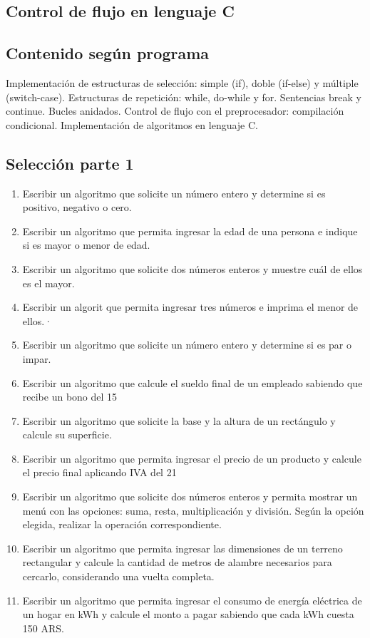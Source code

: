 \setcounter{subsection}{5}
\subsection*{Control de flujo en lenguaje C}
\subsection*{Contenido según programa}
Implementación de estructuras de selección: simple (if), doble (if-else) y múltiple (switch-case). Estructuras de repetición: while, do-while y for. Sentencias break y continue. Bucles anidados. Control de flujo con el preprocesador: compilación condicional. Implementación de algoritmos en lenguaje C.

\begin{ejercicioClase}
  \subsection*{Selección parte 1}
  \begin{enumerate}
    \item Escribir un algoritmo que solicite un número entero y determine si es positivo,  negativo o cero.
    \item Escribir un algoritmo que permita ingresar la edad de una persona e indique si es mayor o menor de edad.
    \item Escribir un algoritmo que solicite dos números enteros y muestre cuál de ellos es el mayor.
    \item Escribir un algorit que permita ingresar tres números e imprima el menor de ellos.·
    \item Escribir un algoritmo que solicite un número entero y determine si es par o impar.
    \item Escribir un algoritmo que calcule el sueldo final de un empleado sabiendo que recibe un bono del 15%
    \item Escribir un algoritmo que solicite la base y la altura de un rectángulo y calcule su superficie.
    \item Escribir un algoritmo que permita ingresar el precio de un producto y calcule el precio final aplicando IVA del 21%
    \item Escribir un algoritmo que solicite dos números enteros y permita mostrar un menú con las opciones: suma, resta, multiplicación y división. Según la opción elegida, realizar la operación correspondiente.
    \item Escribir un algoritmo que permita ingresar las dimensiones de un terreno rectangular y calcule la cantidad de metros de alambre necesarios para cercarlo, considerando una vuelta completa.
    \item Escribir un algoritmo que permita ingresar el consumo de energía eléctrica de un hogar en kWh y calcule el monto a pagar sabiendo que cada kWh cuesta 150 ARS.
  \end{enumerate}
\end{ejercicioClase}

